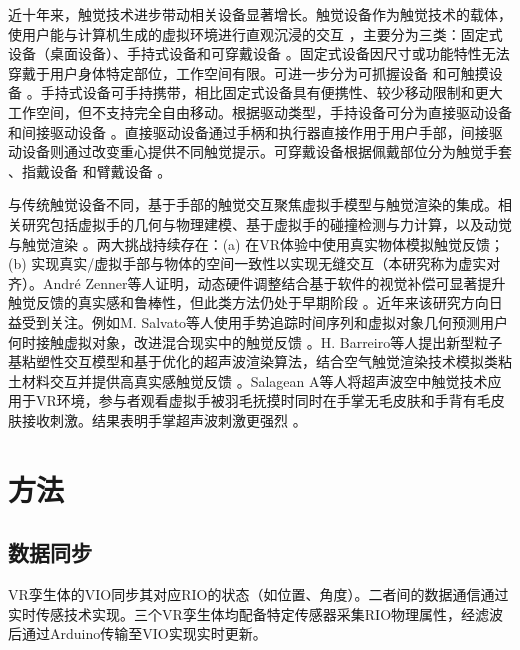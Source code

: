 \documentclass[runningheads]{llncs}
\begin{document}
近十年来，触觉技术进步带动相关设备显著增长。触觉设备作为触觉技术的载体，使用户能与计算机生成的虚拟环境进行直观沉浸的交互 \cite{sreelakshmi2017haptic}，主要分为三类：固定式设备（桌面设备）、手持式设备和可穿戴设备 \cite{adilkhanov2022haptic}。固定式设备因尺寸或功能特性无法穿戴于用户身体特定部位，工作空间有限。可进一步分为可抓握设备 \cite{adel2018rendering,zarate2020contact,feick2023voxelhap} 和可触摸设备 \cite{adilkhanov2020vibero,goetz2020patch}。手持式设备可手持携带，相比固定式设备具有便携性、较少移动限制和更大工作空间，但不支持完全自由移动。根据驱动类型，手持设备可分为直接驱动设备 \cite{sakr2020haptic,chen2019haptivec} 和间接驱动设备 \cite{kovacs2020haptic}。直接驱动设备通过手柄和执行器直接作用于用户手部，间接驱动设备则通过改变重心提供不同触觉提示。可穿戴设备根据佩戴部位分为触觉手套 \cite{ozioko2022smart}、指戴设备 \cite{chinello2019modular,preechayasomboon2021haplets} 和臂戴设备 \cite{zhao2020wearable,pezent2022explorations}。

与传统触觉设备不同，基于手部的触觉交互聚焦虚拟手模型与触觉渲染的集成。相关研究包括虚拟手的几何与物理建模、基于虚拟手的碰撞检测与力计算，以及动觉与触觉渲染 \cite{tong2023survey}。两大挑战持续存在：(a) 在VR体验中使用真实物体模拟触觉反馈；(b) 实现真实/虚拟手部与物体的空间一致性以实现无缝交互（本研究称为虚实对齐）。André Zenner等人证明，动态硬件调整结合基于软件的视觉补偿可显著提升触觉反馈的真实感和鲁棒性，但此类方法仍处于早期阶段 \cite{zenner2021combining}。近年来该研究方向日益受到关注。例如M. Salvato等人使用手势追踪时间序列和虚拟对象几何预测用户何时接触虚拟对象，改进混合现实中的触觉反馈 \cite{salvato2022predicting}。H. Barreiro等人提出新型粒子基粘塑性交互模型和基于优化的超声波渲染算法，结合空气触觉渲染技术模拟类粘土材料交互并提供高真实感触觉反馈 \cite{barreiro2021natural}。Salagean A等人将超声波空中触觉技术应用于VR环境，参与者观看虚拟手被羽毛抚摸时同时在手掌无毛皮肤和手背有毛皮肤接收刺激。结果表明手掌超声波刺激更强烈 \cite{salagean2022virtual}。

\section{方法}

\subsection{数据同步}
VR孪生体的VIO同步其对应RIO的状态（如位置、角度）。二者间的数据通信通过实时传感技术实现。三个VR孪生体均配备特定传感器采集RIO物理属性，经滤波后通过Arduino传输至VIO实现实时更新。
\end{document}
